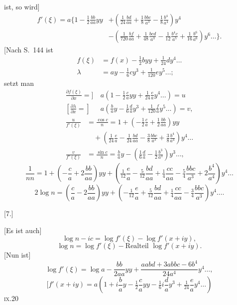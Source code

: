 \noindent ist, so wird]
\[
\begin{aligned}
f'(\xi)=a\biggl\{1-\tfrac12\frac{bb}{aa}yy
 &+\left(\tfrac1{24}\frac{bd}{aa}+\tfrac18\frac{bbc}{a^3}-\tfrac18\frac{b^4}{a^4}\right)y^4\\
 &-\left(\tfrac1{720}\frac{bf}{aa}+\tfrac1{48}\frac{bcd}{a^3}
 -\tfrac1{12}\frac{b^4c}{a^5}+\tfrac1{16}\frac{b^6}{a^6}\right)y^6\ldots\biggr\}.
\end{aligned}
\]
[Nach S.\ 144 ist
\[
\begin{aligned}
f(\xi)&=f(x)-\tfrac12byy+\tfrac1{24}dy^4\ldots\\
\lambda&=ay-\tfrac16cy^3+\tfrac1{120}ey^5\ldots;
\end{aligned}
\]
\noindent setzt man
\[
\begin{aligned}
\frac{\partial f(\xi)}{\partial x}={]}&\ a\left(1-\tfrac12\frac ca yy+\tfrac1{24}\frac ea y^4\ldots\right)=u\\
\left[\frac{\partial\lambda}{\partial x}={}\right]&\ a\left(\frac ba y-\tfrac16\frac da y^3+\tfrac1{120}\frac fa y^5\ldots\right)=v,
\end{aligned}
\]
\noindent [so ist]
\[
\begin{aligned}
\frac{u}{f'(\xi)}&=\frac{\cos c}{n}=1+\left(-\tfrac12\frac ca+\tfrac12\frac{bb}{aa}\right)yy\\
 &\quad+\left(\tfrac1{24}\frac ea-\tfrac1{24}\frac{bd}{aa}-\tfrac38\frac{bbc}{a^3}
 +\tfrac38\frac{b^4}{a^4}\right)y^4\ldots\\
\frac{v}{f'(\xi)}&=\frac{\sin c}{n}=\frac ba y
-\left(\tfrac16\frac da-\tfrac12\frac{b^3}{a^3}\right)y^3\ldots,
\end{aligned}
\]
\[
\frac1{nn}=1+\left(-\frac ca+2\frac{bb}{aa}\right)yy
+\left(\tfrac1{12}\frac ea-\tfrac5{12}\frac{bd}{aa}+\tfrac14\frac{cc}{aa}
-\tfrac54\frac{bbc}{a^3}+2\frac{b^4}{a^4}\right)y^4\ldots
\]
\noindent [und]
\[
2\log n=\left(\frac ca-2\frac{bb}{aa}\right)yy
+\left(-\tfrac1{12}\frac ea+\tfrac5{12}\frac{bd}{aa}+\tfrac14\frac{cc}{aa}
-\tfrac34\frac{bbc}{a^3}\right)y^4\ldots.
\]

\begin{center}[7.]\end{center}
[Es ist auch]
\[
\log n-ic=\log f'(\xi)-\log f'(x+iy),
\]
\noindent [mithin]
\[
\log n=\log f'(\xi)-\text{Realteil }\log f'(x+iy).
\]
[Nun ist]
\[
\log f'(\xi)=\log a-\frac{bb}{2aa}yy+\frac{aabd+3abbc-6b^4}{24a^4}y^4\ldots,
\]
\[
[f'(x+iy)=a\left(1+i\frac ba y-\tfrac12\frac ca yy-\tfrac16i\frac da y^3
+\tfrac1{24}\frac ea y^4\ldots\right)
\]
\noindent\textsc{ix.}\hfill 20\hspace*{.12\linewidth}\par

